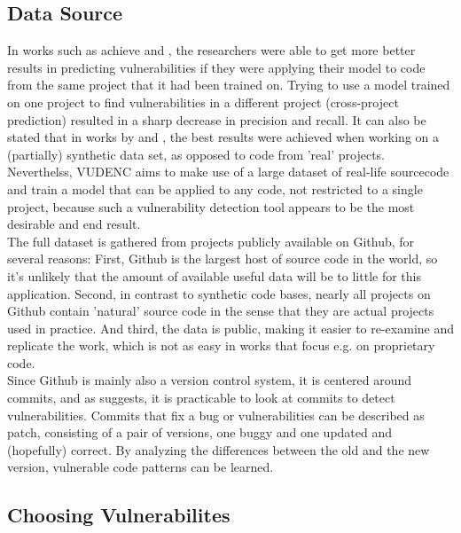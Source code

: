 \documentclass[
	a4paper,
	pagesize,
	pdftex,
	12pt,
	twoside, %
	BCOR=5mm, %
	ngerman,
	fleqn,
	final,
	]{scrartcl}
\begin{document}
\subsection{Data Source}
In works such as \cite{Dam.2017} achieve and \cite{Pang.2015}, the researchers were able to get more better results in predicting vulnerabilities if they were applying their model to code from the same project that it had been trained on. Trying to use a model trained on one project to find vulnerabilities in a different project (cross-project prediction) resulted in a sharp decrease in precision and recall. It can also be stated that in works by \cite{Russell.2018} and \cite{Li.2018}, the best results were achieved when working on a (partially) synthetic data set, as opposed to code from 'real' projects.\\
Neverthelss, VUDENC aims to make use of a large dataset of real-life sourcecode and train a model that can be applied to any code, not restricted to a single project, because such a vulnerability detection tool appears to be the most desirable and end result.\\
The full dataset is gathered from projects publicly available on Github, for several reasons: First, Github is the largest host of source code in the world, so it's unlikely that the amount of available useful data will be to little for this application. Second, in contrast to synthetic code bases, nearly all projects on Github contain 'natural' source code in the sense that they are actual projects used in practice. And third, the data is public, making it easier to re-examine and replicate the work, which is not as easy in works that focus e.g. on proprietary code.\\
Since Github is mainly also a version control system, it is centered around commits, and as \cite{Zhou.2017} suggests, it is practicable to look at commits to detect vulnerabilities. Commits that fix a bug or vulnerabilities can be described as patch, consisting of a pair of versions, one buggy and one updated and (hopefully) correct.  By analyzing the differences between the old and the new version, vulnerable code patterns can be learned. \\

\subsection{Choosing Vulnerabilites}
\end{document}
